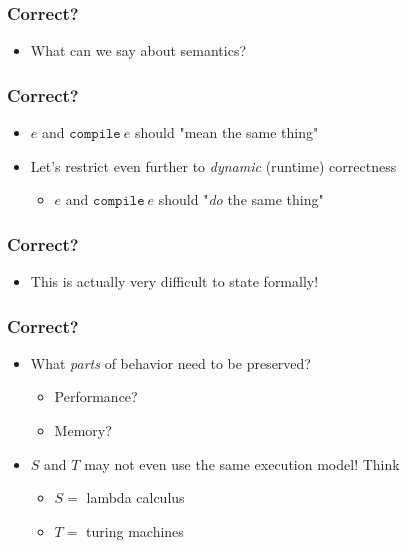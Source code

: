 \documentclass[usenames,dvipsnames]{beamer}
\newcommand{\compile}{\texttt{compile}}
\begin{document}

\begin{frame}
  \frametitle{Correct?}

  \begin{itemize}
    \item What can we say about semantics?
  \end{itemize}
\end{frame}


\begin{frame}
  \frametitle{Correct?}

  \begin{itemize}
    \item $e$ and $\compile\ e$ should "mean the same thing"
    \item Let's restrict even further to \emph{dynamic} (runtime) correctness
      \begin{itemize}
        \item $e$ and $\compile\ e$ should "\emph{do} the same thing"
      \end{itemize}
  \end{itemize}
\end{frame}


\begin{frame}
  \frametitle{Correct?}

  \begin{itemize}
    \item This is actually very difficult to state formally!
  \end{itemize}
\end{frame}


\begin{frame}
  \frametitle{Correct?}

  \begin{itemize}
    \item What \emph{parts} of behavior need to be preserved?
      \begin{itemize}
        \item Performance?
        \item Memory?
      \end{itemize}

    \item $S$ and $T$ may not even use the same execution model! Think
      \begin{itemize}
        \item $S =$ lambda calculus
        \item $T =$ turing machines
      \end{itemize}
  \end{itemize}
\end{frame}
\end{document}
